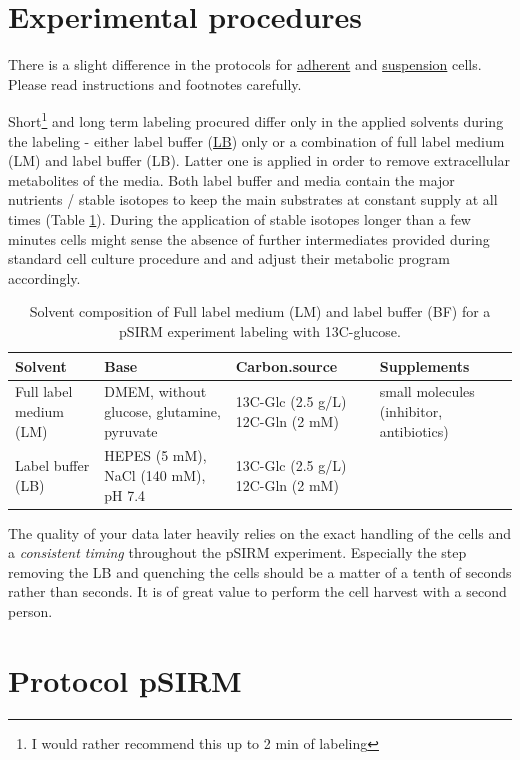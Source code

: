 \documentclass[]{book}
\let\rmarkdownfootnote\footnote%
\def\footnote{\protect\rmarkdownfootnote}
\theoremstyle{definition}
\theoremstyle{definition}
\theoremstyle{definition}
\theoremstyle{remark}
\begin{document}
\section{Experimental procedures}\label{experimental-procedures}

There is a slight difference in the protocols for
\protect\hyperlink{psirm:adherent}{adherent} and
\protect\hyperlink{psirm:suspension}{suspension} cells. Please read
instructions and footnotes carefully.

Short\footnote{I would rather recommend this up to 2 min of labeling}
and long term labeling procured differ only in the applied solvents
during the labeling - either label buffer
(\protect\hyperlink{washingbuffer}{LB}) only or a combination of full
label medium (LM) and label buffer (LB). Latter one is applied in order
to remove extracellular metabolites of the media. Both label buffer and
media contain the major nutrients / stable isotopes to keep the main
substrates at constant supply at all times (Table \ref{tab:solvent}).
During the application of stable isotopes longer than a few minutes
cells might sense the absence of further intermediates provided during
standard cell culture procedure and and adjust their metabolic program
accordingly.

\begin{table}[t]

\caption{\label{tab:solvent}Solvent composition of Full label medium (LM) and label buffer (BF) for a pSIRM experiment labeling with 13C-glucose.}
\centering
\begin{tabular}{llll}
\toprule
Solvent & Base & Carbon.source & Supplements\\
\midrule
Full label medium (LM) & DMEM, without glucose, glutamine, pyruvate & 13C-Glc (2.5 g/L)
12C-Gln (2 mM) & small molecules 
(inhibitor, antibiotics)\\
Label buffer (LB) & HEPES (5 mM), NaCl (140 mM), pH 7.4 & 13C-Glc (2.5 g/L)
12C-Gln (2 mM) & \\
\bottomrule
\end{tabular}
\end{table}

The quality of your data later heavily relies on the exact handling of
the cells and a \emph{consistent timing} throughout the pSIRM
experiment. Especially the step removing the LB and quenching the cells
should be a matter of a tenth of seconds rather than seconds. It is of
great value to perform the cell harvest with a second person.

\section{Protocol pSIRM}\label{protocol-psirm}
\end{document}
